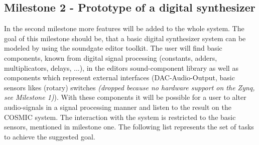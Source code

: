 \subsection{Milestone 2 - Prototype of a digital synthesizer}

In the second milestone more features will be added to the whole system. 
The goal of this milestone should be, that a basic digital synthesizer system can be modeled by using the soundgate editor toolkit. 
The user will find basic components, known from digital signal processing (constants, adders, multiplicators, delays, ...), in the editors sound-component library as well as components which represent external interfaces (DAC-Audio-Output, basic sensors likes (rotary) switches \textit{(dropped because no hardware support on the Zynq, see Milestone 1)}).
With these components it will be possible for a user to alter audio-signals in a signal processing manner and listen to the result on the \ac{COSMIC} system. 
The interaction with the system is restricted to the basic sensors, mentioned in milestone one. The following list represents the set of tasks to achieve the suggested goal.

